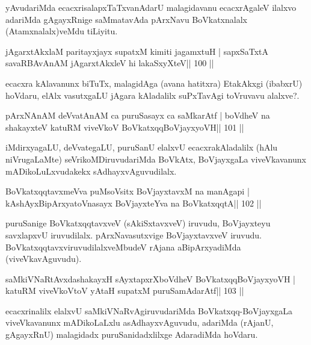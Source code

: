 \begin{artha}
yAvudariMda ecacxrisalapxTaTxvanAdarU malagidavanu ecacxrAgaleV ilalxvo adariMda gAgayxRnige saMmatavAda pArxNavu BoVkatxnalalx (Atamxnalalx)veMdu tiLiyitu.
\end{artha} 


\begin{shl}
jAgarxtAkxlaM paritayxjayx supatxM kimiti jagamxtuH |
sapxSaTxtA savaRBAvAnAM jAgarxtAkxleV hi lakaSxyXteV\hfill || 100 ||
\end{shl}

\begin{artha}
ecacxra kAlavanunx biTuTx, malagidAga (avana hatitxra) EtakAkxgi (ibabxrU) hoVdaru, elAlx vasutxgaLU jAgara kAladalilx suPxTavAgi toVruvavu  alalxve?.
\end{artha}


\begin{shl}
pArxNAnAM deVvatAnAM ca puruSasayx ca saMkarAtf |
boVdheV na shakayxteV katuRM viveVkoV BoVkatxqqBoVjayxyoVH\hfill || 101 ||
\end{shl}

\begin{artha}
iMdirxyagaLU, deVvategaLU, puruSanU elalxvU ecacxrakAladalilx (hAlu niVrugaLaMte) seVrikoMDiruvudariMda BoVkAtx, BoVjayxgaLa viveVkavanunx mADikoLuLxvudakekx sAdhayxvAguvudilalx.
\end{artha} 

\begin{shl}
BoVkatxqqtavxmeVva puMsoV\s sitx BoVjayxtavxM na manAgapi |
kAshAyxBipArxyatoV\s nasayx BoVjayxteYva na BoVkatxqqtA\hfill || 102 ||
\end{shl}

\begin{artha}
puruSanige BoVkatxqqtavxveV (sAkiSxtavxveV) iruvudu, BoVjayxteyu savxlapxvU iruvudilalx. pArxNavasutxvige BoVjayxtavxveV iruvudu. BoVkatxqqtavxviruvudilalxveMbudeV rAjana aBipArxyadiMda (viveVkavAguvudu).
\end{artha}

\begin{shl}
saMkiVNaRtAvxdashakayxH sAyxtapxrXboVdheV BoVkatxqqBoVjayxyoVH |
katuRM viveVkoV\s toV yAtaH supatxM puruSamAdarAtf\hfill || 103 ||
\end{shl}

\begin{artha}
ecacxrinalilx elalxvU saMkiVNaRvAgiruvudariMda BoVkatxqq-BoVjayxgaLa viveVkavanunx mADikoLaLxlu asAdhayxvAguvudu, adariMda (rAjanU, gAgayxRnU) malagidadx puruSanidadxlilxge AdaradiMda hoVdaru.
\end{artha}

